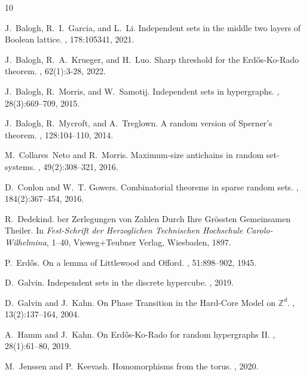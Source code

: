 \documentclass[12pt]{article}
\begin{document}
\begin{thebibliography}{10}

J.~Balogh, R.~I.~Garcia, and L.~Li.
\newblock Independent sets in the middle two layers of Boolean lattice.
, 178:105341, 2021.

J.~Balogh, R.~A.~Krueger, and H.~Luo.
\newblock Sharp threshold for the {E}rd{\H{o}}s-{K}o-{R}ado theorem.
, 62(1):3-28, 2022.


J.~Balogh, R.~Morris, and W.~Samotij.
\newblock Independent sets in hypergraphs.
, 28(3):669--709,
  2015.

J.~Balogh, R.~Mycroft, and A.~Treglown.
\newblock A random version of {S}perner's theorem.
, 128:104--110, 2014.

M.~Collares~Neto and R.~Morris.
\newblock Maximum-size antichains in random set-systems.
, 49(2):308--321, 2016.

D.~Conlon and W.~T. Gowers.
\newblock Combinatorial theorems in sparse random sets.
, 184(2):367--454, 2016.

R.~Dedekind.
ber Zerlegungen von Zahlen Durch Ihre Gr{\"o}ssten Gemeinsamen Theiler.
\newblock In {\em Fest-Schrift der Herzoglichen Technischen Hochschule Carolo-Wilhelmina}, 1--40, Vieweg+Teubner Verlag, Wiesbaden, 1897.

P.~Erd\H{o}s.
\newblock On a lemma of Littlewood and Offord.
, 51:898--902, 1945.

D.~Galvin.
\newblock Independent sets in the discrete hypercube.
, 2019.

D.~Galvin and J.~Kahn.
\newblock On Phase Transition in the Hard-Core Model on $\mathbb{Z}^d$.
, 13(2):137--164, 2004.

A.~Hamm and J.~Kahn.
\newblock On {E}rd{\H{o}}s-{K}o-{R}ado for random hypergraphs {II}.
, 28(1):61--80, 2019.

M.~Jenssen and P.~Keevash.
\newblock Homomorphisms from the torus.
, 2020.


\end{thebibliography}
\end{document}
